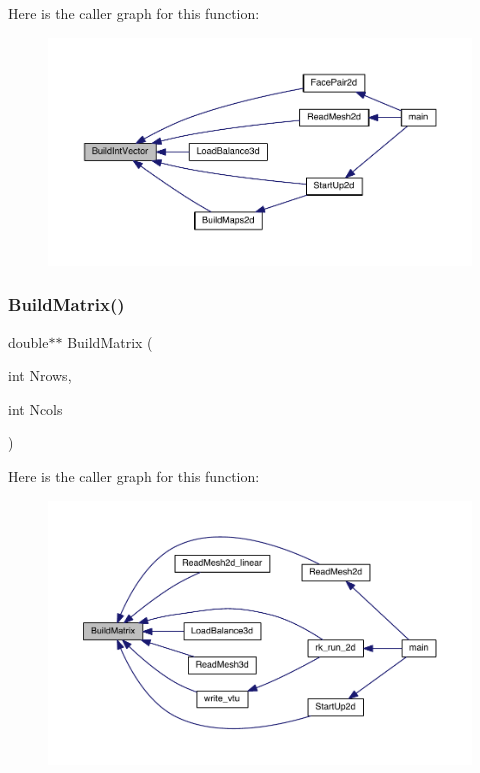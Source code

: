 Here is the caller graph for this function\+:\nopagebreak
\begin{figure}[H]
\begin{center}
\leavevmode
\includegraphics[width=350pt]{a00602_a0f24d8056fa979af4888469ea90576ff_icgraph}
\end{center}
\end{figure}
\mbox{\label{a00602_a4bf6e503687187059ced10b812beaab3}} 
\subsubsection{\texorpdfstring{Build\+Matrix()}{BuildMatrix()}}
{\footnotesize\ttfamily double$\ast$$\ast$ Build\+Matrix (\begin{DoxyParamCaption}\item[{int}]{Nrows,  }\item[{int}]{Ncols }\end{DoxyParamCaption})}

Here is the caller graph for this function\+:\nopagebreak
\begin{figure}[H]
\begin{center}
\leavevmode
\includegraphics[width=350pt]{a00602_a4bf6e503687187059ced10b812beaab3_icgraph}
\end{center}
\end{figure}
\mbox{\label{a00602_a990278305dbeaf8e4441cf4146bfdc62}} 
